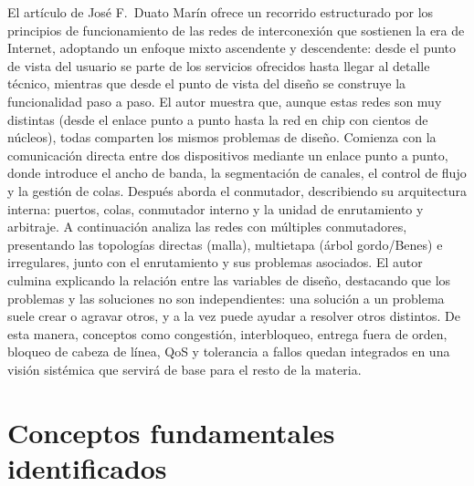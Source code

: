 \documentclass[12pt,a4paper]{article}
\begin{document}
El artículo de José F.~Duato Marín ofrece un recorrido estructurado por los principios de funcionamiento de las redes de interconexión que sostienen la era de Internet, adoptando un enfoque mixto ascendente y descendente: desde el punto de vista del usuario se parte de los servicios ofrecidos hasta llegar al detalle técnico, mientras que desde el punto de vista del diseño se construye la funcionalidad paso a paso. El autor muestra que, aunque estas redes son muy distintas (desde el enlace punto a punto hasta la red en chip con cientos de núcleos), todas comparten los mismos problemas de diseño. Comienza con la comunicación directa entre dos dispositivos mediante un enlace punto a punto, donde introduce el ancho de banda, la segmentación de canales, el control de flujo y la gestión de colas. Después aborda el conmutador, describiendo su arquitectura interna: puertos, colas, conmutador interno y la unidad de enrutamiento y arbitraje. A continuación analiza las redes con múltiples conmutadores, presentando las topologías directas (malla), multietapa (árbol gordo/Benes) e irregulares, junto con el enrutamiento y sus problemas asociados. El autor culmina explicando la relación entre las variables de diseño, destacando que los problemas y las soluciones no son independientes: una solución a un problema suele crear o agravar otros, y a la vez puede ayudar a resolver otros distintos. De esta manera, conceptos como congestión, interbloqueo, entrega fuera de orden, bloqueo de cabeza de línea, QoS y tolerancia a fallos quedan integrados en una visión sistémica que servirá de base para el resto de la materia.

\section{Conceptos fundamentales identificados}
\end{document}
